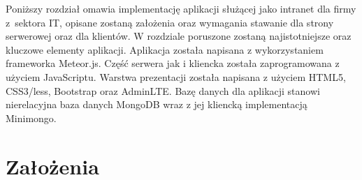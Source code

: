 Poniższy rozdział omawia implementację aplikacji służącej jako intranet dla firmy z~sektora IT, opisane zostaną założenia oraz wymagania stawanie dla strony serwerowej oraz dla klientów. W rozdziale poruszone zostaną najistotniejsze oraz kluczowe elementy aplikacji. Aplikacja została napisana z wykorzystaniem frameworka Meteor.js. Część serwera jak i kliencka została zaprogramowana z użyciem JavaScriptu. Warstwa prezentacji została napisana z użyciem HTML5, CSS3/less, Bootstrap oraz AdminLTE. Bazę danych dla aplikacji stanowi nierelacyjna baza danych MongoDB wraz z jej kliencką implementacją Minimongo.

\section{Założenia}

